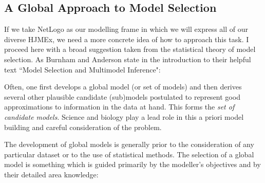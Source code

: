 \subsection{A Global Approach to Model Selection}

If we take NetLogo as our modelling frame in which we will express all of our diverse HJMEx, we need a more concrete idea of how to approach this task. I proceed here with a broad suggestion taken from the statistical theory of model selection. As Burnham and Anderson state in the introduction to their helpful text ``Model Selection and Multimodel Inference":

\begin{longquote}
Often, one first develops a global model (or set of models) and then derives
several other plausible candidate (sub)models postulated to represent good approximations to information in the data at hand. This forms the \textit{set of candidate models}. Science and biology play a lead role in this a priori model building and careful consideration of the problem. \cite[p.2]{Burnham2002}
\end{longquote}
The development of global models is generally prior to the consideration of any particular dataset or to the use of statistical methods. The selection of a global model is something which is guided primarily by the modeller's objectives and by their detailed area knowledge:

